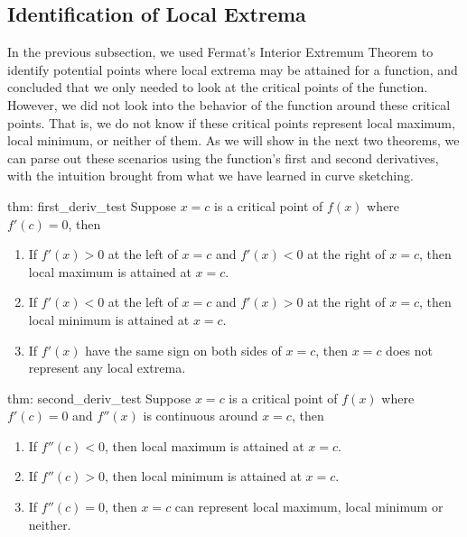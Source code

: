 \subsection{Identification of Local Extrema}

In the previous subsection, we used Fermat's Interior Extremum Theorem to identify potential points where local extrema may be attained for a function, and concluded that we only needed to look at the critical points of the function.  However, we did not look into the behavior of the function around these critical points.  That is, we do not know if these critical points represent local maximum, local minimum, or neither of them.  As we will show in the next two theorems, we can parse out these scenarios using the function's first and second derivatives, with the intuition brought from what we have learned in curve sketching.

\begin{theo}{thm: first_deriv_test}
    Suppose $x = c$ is a critical point of $f(x)$ where $f'(c) = 0$, then
    \begin{enumerate}
        \item If $f'(x) > 0$ at the left of $x = c$ and $f'(x) < 0$ at the right of $x = c$, then local maximum is attained at $x=c$.
        \item If $f'(x) < 0$ at the left of $x = c$ and $f'(x) > 0$ at the right of $x = c$, then local minimum is attained at $x=c$.
        \item If $f'(x)$ have the same sign on both sides of $x = c$, then $x = c$ does not represent any local extrema.
    \end{enumerate}
\end{theo}

\begin{theo}{thm: second_deriv_test}
    Suppose $x = c$ is a critical point of $f(x)$ where $f'(c) = 0$ and $f''(x)$ is continuous around $x = c$, then
    \begin{enumerate}
        \item If $f''(c) < 0$, then local maximum is attained at $x=c$.
        \item If $f''(c) > 0$, then local minimum is attained at $x=c$.
        \item If $f''(c) = 0$, then $x = c$ can represent local maximum, local minimum or neither.
    \end{enumerate}
\end{theo}


